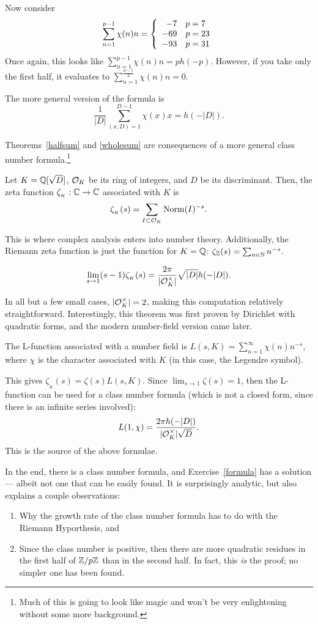 Now consider
\[
\sum_{n=1}^{p-1}\chi(n)n =\left\{
\begin{array}{r l}
-7 & p = 7\\-69 & p = 23\\ -93 & p = 31\end{array}\right.
\]
Once again, this looks like $\sum_{n=1}^{p-1} \chi(n)n = ph(-p)$. However, if you take only the first half, it evaluates to $\sum_{n=1}^{\frac{p-1}{2}} \chi(n)n = 0$.
\begin{thm}
\label{wholesum}
The more general version of the formula is
\[\frac{1}{|D|}\sum_{(x,D) = 1}^{D-1}\chi(x)x = h(-|D|).\]
\end{thm}
Theorems~\ref{halfsum} and \ref{wholesum} are consequences of a more general class number formula.\footnote{Much of this is going to look like magic and won't be very enlightening without some more background.}
\begin{defn}
Let $K =\mathbb{Q}[\sqrt D]$, $\mathcal{O}_K$ be its ring of integers, and $D$ be its discriminant. Then, the zeta function $\zeta_{_K}:\mathbb{C}\to\mathbb{C}$ associated with $K$ is 
\[\zeta_{_K}(s) = \sum_{I\subset\mathcal{O}_K}\operatorname{Norm}(I)^{-s}.\]
\end{defn}
This is where complex analysis enters into number theory. Additionally, the Riemann zeta function is just the function for $K = \mathbb{Q}$: $\zeta_{\mathbb{Z}}(s) = \sum_{n\in\mathbb{N}} n^{-s}$.
\begin{thm}
\[\lim_{s\to 1} (s-1)\zeta_{_K}(s) = \frac{2\pi}{|\mathcal{O}_K^\times|}\sqrt{|D|}h(-|D|).\]
\end{thm}
In all but a few small cases, $|\mathcal{O}_K^\times| = 2$, making this computation relatively straightforward. Interestingly, this theorem was first proven by Dirichlet with quadratic forms, and the modern number-field version came later.
\begin{defn}
The L-function associated with a number field is $L(s,K) = \sum_{n=1}^\infty \chi(n)n^{-s}$, where $\chi$ is the character associated with $K$ (in this case, the Legendre symbol).
\end{defn}
This gives $\zeta_{_K}(s) = \zeta(s)L(s,K)$. Since $\lim_{s\to 1} \zeta(s) = 1$, then the L-function can be used for a class number formula (which is not a closed form, since there is an infinite series involved):
\[L(1,\chi) = \frac{2\pi h(-|D|)}{|\mathcal{O}_K^\times|\sqrt D}.\]
This is the source of the above formulae.

In the end, there is a class number formula, and Exercise~\ref{formula} has a solution --- albeit not one that can be easily found. It is surprisingly analytic, but also explains a couple observations:
\begin{enumerate}
\item Why the growth rate of the class number formula has to do with the Riemann Hyporthesis, and
\item Since the class number is positive, then there are more quadratic residues in the first half of $\mathbb{Z}/p\mathbb{Z}$ than in the second half. In fact, this \emph{is} the proof; no simpler one has been found.
\end{enumerate}
